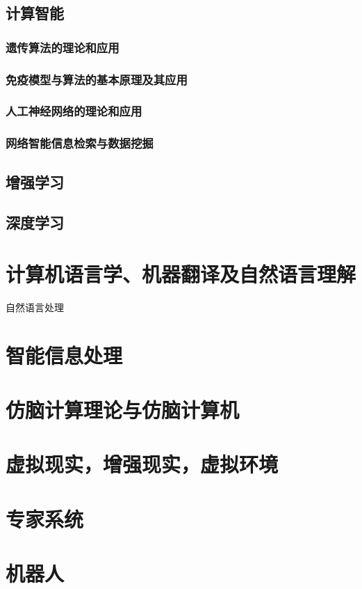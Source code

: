 \documentclass[UTF8]{../computerUniverse}
\begin{document}
\section{计算智能}

\subsection{遗传算法的理论和应用}
\subsection{免疫模型与算法的基本原理及其应用}
\subsection{人工神经网络的理论和应用}
\subsection{网络智能信息检索与数据挖掘}



\section{增强学习}
\section{深度学习}



\chapter{计算机语言学、机器翻译及自然语言理解}
自然语言处理

\chapter{智能信息处理}
\chapter{仿脑计算理论与仿脑计算机}
\chapter{虚拟现实，增强现实，虚拟环境}

\chapter{专家系统}
\chapter{机器人}
\end{document}
